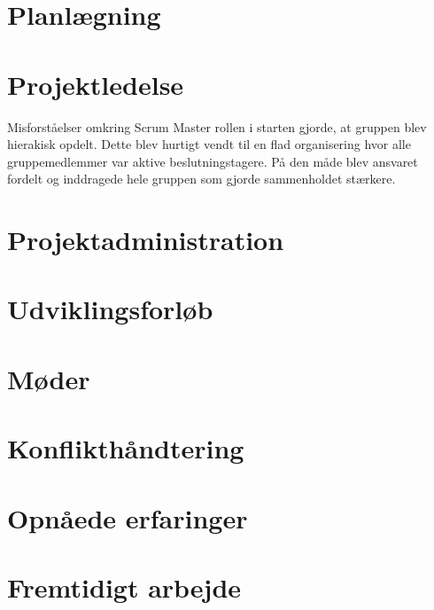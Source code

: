 \section*{Planlægning}

\section*{Projektledelse}
Misforståelser omkring Scrum Master rollen i starten gjorde, at gruppen blev hierakisk opdelt. Dette blev hurtigt vendt til en flad organisering hvor alle gruppemedlemmer var aktive beslutningstagere. På den måde blev ansvaret fordelt og inddragede hele gruppen som gjorde sammenholdet stærkere.

\section*{Projektadministration}

\section*{Udviklingsforløb}

\section*{Møder}

\section*{Konflikthåndtering}

\section*{Opnåede erfaringer}

\section*{Fremtidigt arbejde}